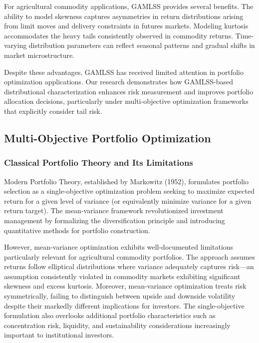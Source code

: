 \documentclass[
  10pt,
  a4paper,
]{article}
\begin{document}
For agricultural commodity applications, GAMLSS provides several
benefits. The ability to model skewness captures asymmetries in return
distributions arising from limit moves and delivery constraints in
futures markets. Modeling kurtosis accommodates the heavy tails
consistently observed in commodity returns. Time-varying distribution
parameters can reflect seasonal patterns and gradual shifts in market
microstructure.

Despite these advantages, GAMLSS has received limited attention in
portfolio optimization applications. Our research demonstrates how
GAMLSS-based distributional characterization enhances risk measurement
and improves portfolio allocation decisions, particularly under
multi-objective optimization frameworks that explicitly consider tail
risk.

\subsection{Multi-Objective Portfolio
Optimization}\label{multi-objective-portfolio-optimization}

\subsubsection{Classical Portfolio Theory and Its
Limitations}\label{classical-portfolio-theory-and-its-limitations}

Modern Portfolio Theory, established by Markowitz (1952), formulates
portfolio selection as a single-objective optimization problem seeking
to maximize expected return for a given level of variance (or
equivalently minimize variance for a given return target). The
mean-variance framework revolutionized investment management by
formalizing the diversification principle and introducing quantitative
methods for portfolio construction.

However, mean-variance optimization exhibits well-documented limitations
particularly relevant for agricultural commodity portfolios. The
approach assumes returns follow elliptical distributions where variance
adequately captures risk---an assumption consistently violated in
commodity markets exhibiting significant skewness and excess kurtosis.
Moreover, mean-variance optimization treats risk symmetrically, failing
to distinguish between upside and downside volatility despite their
markedly different implications for investors. The single-objective
formulation also overlooks additional portfolio characteristics such as
concentration risk, liquidity, and sustainability considerations
increasingly important to institutional investors.
\end{document}
